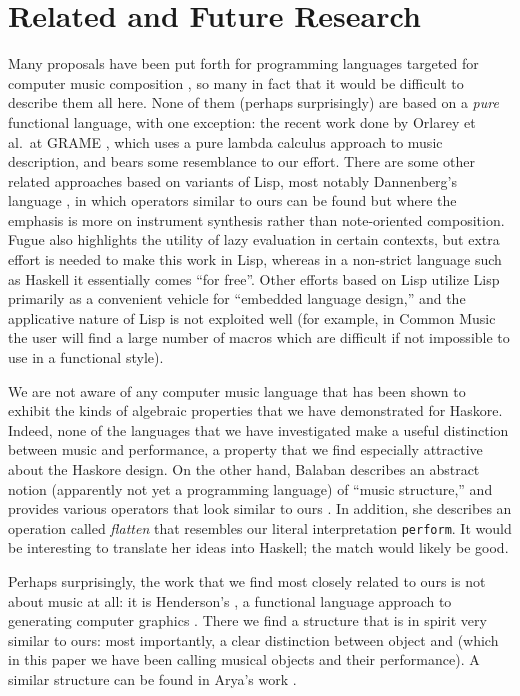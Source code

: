 \section{Related and Future Research}

Many proposals have been put forth for programming languages targeted
for computer music composition
\cite{canon,pla,moxie,formula,fugue,scoresynth,formes,grame94},
so many in fact that it would be difficult to describe them all here.
None of them (perhaps surprisingly) are based on a {\em pure}
functional language, with one exception: the recent work done by
Orlarey et al.\ at GRAME \cite{grame94}, which uses a pure lambda
calculus approach to music description, and bears some resemblance to
our effort.  There are some other related approaches based on variants
of Lisp, most notably Dannenberg's  language \cite{fugue},
in which operators similar to ours can be found but where the emphasis
is more on instrument synthesis rather than note-oriented composition.
Fugue also highlights the utility of lazy evaluation in certain
contexts, but extra effort is needed to make this work in Lisp,
whereas in a non-strict language such as Haskell it essentially comes
``for free''.  Other efforts based on Lisp utilize Lisp primarily as a
convenient vehicle for ``embedded language design,'' and the
applicative nature of Lisp is not exploited well (for example, in
Common Music the user will find a large number of macros which are
difficult if not impossible to use in a functional style).

We are not aware of any computer music language that has been shown to
exhibit the kinds of algebraic properties that we have demonstrated
for Haskore.  Indeed, none of the languages that we have investigated
make a useful distinction between music and performance, a property
that we find especially attractive about the Haskore design.  On the
other hand, Balaban describes an abstract notion (apparently not yet a
programming language) of ``music structure,'' and provides various
operators that look similar to ours \cite{balaban92}.  In addition,
she describes an operation called {\em flatten} that resembles our
literal interpretation {\tt perform}.  It would be interesting to
translate her ideas into Haskell; the match would likely be good.

Perhaps surprisingly, the work that we find most closely related to
ours is not about music at all: it is Henderson's , a functional language approach to generating computer
graphics \cite{henderson82}.  There we find a structure that is in
spirit very similar to ours: most importantly, a clear distinction
between object  and  (which in
this paper we have been calling musical objects and their
performance).  A similar structure can be found in Arya's
 work \cite{arya94}.


